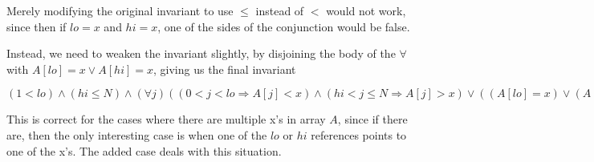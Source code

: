 \documentclass[12pt]
{article}
\newenvironment{solution}[1][Solution]{\begin{trivlist}
\item[\hskip \labelsep {\bfseries #1}]}{\end{trivlist}}
\begin{document}
\begin{solution}
Merely modifying the original invariant to use $\leq$ instead of $<$
would not work, since then if $lo = x$ and $hi = x$, one of the sides
of the conjunction would be false.  

Instead, we need to weaken the invariant slightly, by disjoining the
body of the $\forall$ with $A[lo] = x \lor A[hi] = x$, giving us the
final invariant


$(1 < lo) \land (hi \leq N) \land (\forall j)((0 < j < lo \Rightarrow A[j] < x)
\land (hi < j \leq N \Rightarrow  A[j] > x)
\lor((A[lo] = x) \lor (A[hi] = x)))$

This is correct for the cases where there are multiple x's in array
$A$, since if there are, then the only interesting case is when one of
the $lo$ or $hi$ references points to one of the x's.  The added case
deals with this situation.


\end{solution}
\end{document}
